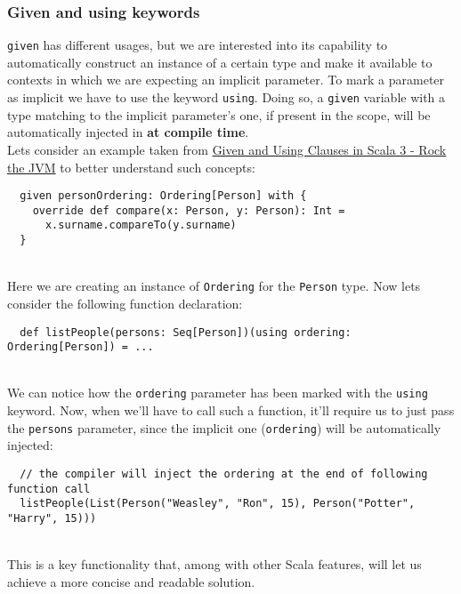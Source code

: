 \subsubsection{Given and using keywords}
\label{par:given-using}
\texttt{given} has different usages, but we are interested into its capability to automatically construct an instance of a certain type and make it available to contexts in which we are expecting an implicit parameter.
To mark a parameter as implicit we have to use the keyword \texttt{using}.
Doing so, a \texttt{given} variable with a type matching to the implicit parameter's one, if present in the scope, will be automatically injected in \textbf{at compile time}.\\
Lets consider an example taken from \href{https://blog.rockthejvm.com/scala-3-given-using/}{Given and Using Clauses in Scala 3 - Rock the JVM} to better understand such concepts:
\begin{verbatim}
  given personOrdering: Ordering[Person] with {
    override def compare(x: Person, y: Person): Int = 
      x.surname.compareTo(y.surname)
  }
\end{verbatim}\mbox{}\\
Here we are creating an instance of \texttt{Ordering} for the \texttt{Person} type.
Now lets consider the following function declaration:
\begin{verbatim}
  def listPeople(persons: Seq[Person])(using ordering: Ordering[Person]) = ...
\end{verbatim}\mbox{}\\
We can notice how the \texttt{ordering} parameter has been marked with the \texttt{using} keyword.
Now, when we'll have to call such a function, it'll require us to just pass the \texttt{persons} parameter, since the implicit one (\texttt{ordering}) will be automatically injected:
\begin{verbatim}
  // the compiler will inject the ordering at the end of following function call
  listPeople(List(Person("Weasley", "Ron", 15), Person("Potter", "Harry", 15)))
\end{verbatim}\mbox{}\\
This is a key functionality that, among with other Scala features, will let us achieve a more concise and readable solution.


